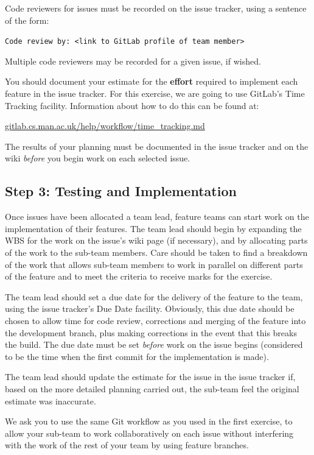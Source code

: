 \documentclass[
]{book}
\begin{document}
Code reviewers for issues must be recorded on the issue tracker, using a sentence of the form:

\texttt{Code\ review\ by:\ \textless{}link\ to\ GitLab\ profile\ of\ team\ member\textgreater{}}

Multiple code reviewers may be recorded for a given issue, if wished.

You should document your estimate for the \textbf{effort} required to implement each feature in the issue tracker. For this exercise, we are going to use GitLab's Time Tracking facility. Information about how to do this can be found at:

\href{https://gitlab.cs.man.ac.uk/help/workflow/time_tracking.md}{gitlab.cs.man.ac.uk/help/workflow/time\_tracking.md}

The results of your planning must be documented in the issue tracker and on the wiki \emph{before} you begin work on each selected issue.

\hypertarget{timp}{%
\subsection{Step 3: Testing and Implementation}\label{timp}}

Once issues have been allocated a team lead, feature teams can start work on the implementation of their features. The team lead should begin by expanding the WBS for the work on the issue's wiki page (if necessary), and by allocating parts of the work to the sub-team members. Care should be taken to find a breakdown of the work that allows sub-team members to work in parallel on different parts of the feature and to meet the criteria to receive marks for the exercise.

The team lead should set a due date for the delivery of the feature to the team, using the issue tracker's Due Date facility. Obviously, this due date should be chosen to allow time for code review, corrections and merging of the feature into the development branch, plus making corrections in the event that this breaks the build. The due date must be set \emph{before} work on the issue begins (considered to be the time when the first commit for the implementation is made).

The team lead should update the estimate for the issue in the issue tracker if, based on the more detailed planning carried out, the sub-team feel the original estimate was inaccurate.

We ask you to use the same Git workflow as you used in the first exercise, to allow your sub-team to work collaboratively on each issue without interfering with the work of the rest of your team by using feature branches.
\end{document}
